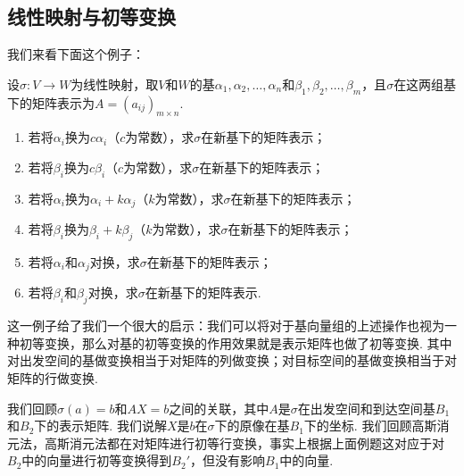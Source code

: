 \begin{solution}

\end{solution}

\subsection{线性映射与初等变换}

我们来看下面这个例子：
\begin{example}
    设$\sigma:V\to W$为线性映射，取$V$和$W$的基$\alpha_1,\alpha_2,\ldots,\alpha_n$和$\beta_1,\beta_2,\ldots,\beta_m$，且$\sigma$在这两组基下的矩阵表示为$A=(a_{ij})_{m\times n}$.
    \begin{enumerate}
        \item 若将$\alpha_i$换为$c\alpha_i$（$c$为常数），求$\sigma$在新基下的矩阵表示；

        \item 若将$\beta_i$换为$c\beta_i$（$c$为常数），求$\sigma$在新基下的矩阵表示；

        \item 若将$\alpha_i$换为$\alpha_i+k\alpha_j$（$k$为常数），求$\sigma$在新基下的矩阵表示；

        \item 若将$\beta_i$换为$\beta_i+k\beta_j$（$k$为常数），求$\sigma$在新基下的矩阵表示；

        \item 若将$\alpha_i$和$\alpha_j$对换，求$\sigma$在新基下的矩阵表示；

        \item 若将$\beta_i$和$\beta_j$对换，求$\sigma$在新基下的矩阵表示.
    \end{enumerate}
\end{example}

\begin{solution}

\end{solution}

这一例子给了我们一个很大的启示：我们可以将对于基向量组的上述操作也视为一种初等变换，那么对基的初等变换的作用效果就是表示矩阵也做了初等变换. 其中对出发空间的基做变换相当于对矩阵的列做变换；对目标空间的基做变换相当于对矩阵的行做变换.

我们回顾$\sigma(a)=b$和$AX=b$之间的关联，其中$A$是$\sigma$在出发空间和到达空间基$B_1$和$B_2$下的表示矩阵. 我们说解$X$是$b$在$\sigma$下的原像在基$B_1$下的坐标. 我们回顾高斯消元法，高斯消元法都在对矩阵进行初等行变换，事实上根据上面例题这对应于对$B_2$中的向量进行初等变换得到$B_2'$，但没有影响$B_1$中的向量.

